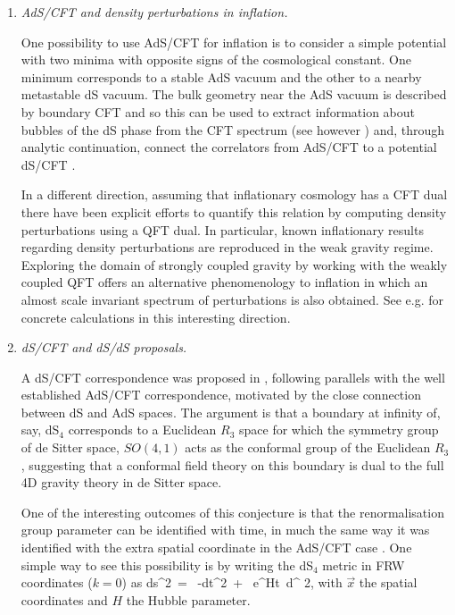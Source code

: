 \begin{enumerate}
\item {\it AdS/CFT  and density perturbations in inflation.} 

One possibility to use AdS/CFT for inflation is to consider a simple potential with two minima with opposite signs of the cosmological constant. 
One minimum corresponds to a stable AdS vacuum and the other to a nearby metastable dS vacuum. The bulk geometry 
near the AdS vacuum is described by boundary CFT and so this can be used to extract information about bubbles of the dS phase from the CFT spectrum \cite{Freivogel:2005qh} (see however \cite{DeAlwis:2019rxg}) and, through analytic continuation, connect the correlators from AdS/CFT to a potential dS/CFT .

In a different direction, assuming that inflationary cosmology has a CFT dual there have been explicit efforts to quantify this 
relation by computing density perturbations using a QFT dual. In particular, known inflationary results regarding
 density perturbations are reproduced in the weak gravity regime. Exploring the domain of strongly coupled gravity by working with 
 the weakly coupled QFT offers an alternative phenomenology to inflation in which an almost scale invariant spectrum of 
 perturbations is also obtained. See e.g. \cite{Freivogel:2005qh, McFadden:2009fg, Bzowski:2012ih, Kundu:2014gxa} for concrete calculations in this
  interesting direction.

\item {\it dS/CFT and dS/dS proposals.} 

A dS/CFT correspondence
 was proposed in \cite{Strominger:2001pn}, following parallels with the
well established AdS/CFT correspondence,
 motivated by the close connection between dS and AdS spaces.
The argument is that a boundary at infinity of, say,  dS$_4$ corresponds to a Euclidean $R_3$
space for which the symmetry group of de Sitter space, $SO(4,1)$ acts as the conformal group
of the Euclidean $R_3$, suggesting that a conformal field theory on this boundary is dual to the full 4D gravity theory in de Sitter space.

 One of the interesting outcomes of
 this conjecture is that the renormalisation group parameter can be identified with
time, in much the same way it was identified with the extra spatial 
coordinate in the AdS/CFT case \cite{Strominger:2001gp}. One simple way to see this possibility is 
by writing the dS$_4$ metric in FRW coordinates ($k=0$) as
\be
ds^2\ = \ -dt^2\ + \ e^{Ht}\ d^{\,\,2},
\ee
with $\vec{x}$ the spatial coordinates 
 and $H$ the Hubble parameter. 
 

\end{enumerate}
